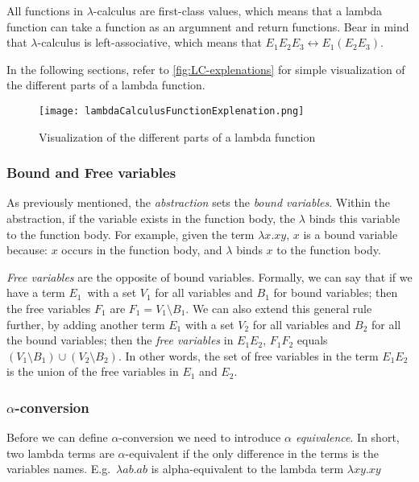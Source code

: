 \para
All functions in $\lambda$-calculus are first-class values, which means that a lambda function can take a function as an argumnent and return functions. Bear in mind that $\lambda$-calculus is left-associative, which means that $E_1 E_2 E_3 \leftrightarrow E_1 (E_2 E_3)$.

\para
In the following sections, refer to \autoref{fig:LC-explenations} for simple visualization of the different parts of a lambda function. 
\begin{figure}
    \centering
    \texttt{[image: lambdaCalculusFunctionExplenation.png]}
    \caption{Visualization of the different parts of a lambda function}
    \label{fig:LC-explenations}
\end{figure}

\subsubsection{Bound and Free variables}
As previously mentioned, the \emph{abstraction} sets the \emph{bound variables}. Within the abstraction, if the variable exists in the function body, the $\lambda$ binds this variable to the function body. For example, given the term $\lambda x.xy$, $x$ is a bound variable because: $x$ occurs in the function body, and $\lambda$ binds $x$ to the function body.

\para
\emph{Free variables} are the opposite of bound variables. Formally, we can say that if we have a term $E_1$ with a set $V_1$ for all variables and $B_1$ for bound variables; 
then the free variables $F_1$ are $F_1 = V_1\setminus B_1$. We can also extend this general rule further, 
by adding another term $E_1$ with a set $V_2$ for all variables and $B_2 $ for all the bound variables;
then the \emph{free variables} in $E_1 E_2$, $F_1 F_2$ equals $ (V_1\setminus B_1) \cup (V_2\setminus B_2)$. 
In other words, the set of free variables in the term $E_1 E_2$ is the union of the free variables in $E_1$ and $E_2$.

\subsubsection{$\alpha$-conversion}
Before we can define $\alpha$-conversion we need to introduce \emph{$\alpha$ equivalence}. In short, two lambda terms are $\alpha$-equivalent if the only difference in the terms is the variables names. E.g.~$\lambda ab.ab$ is alpha-equivalent to the lambda term $\lambda xy.xy$ 

